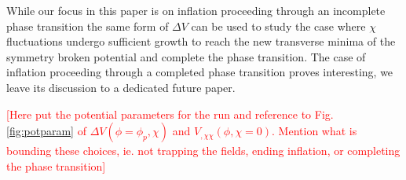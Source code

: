 \Fpotential

While our focus in this paper is on inflation proceeding through an incomplete phase transition the same form of $\Delta V$ can be used to study the case where $\chi$ fluctuations undergo sufficient growth to reach the new transverse minima of the symmetry broken potential and complete the phase transition. The case of inflation proceeding through a completed phase transition proves interesting, we leave its discussion to a dedicated future paper.

\Fpotparam

\textcolor{red}{[Here put the potential parameters for the run and reference to Fig. \ref{fig:potparam} of $\Delta V(\phi=\phi_p,\chi)$ and $V_{,\chi\chi}(\phi,\chi=0)$. Mention what is bounding these choices, ie. not trapping the fields, ending inflation, or completing the phase transition]}




